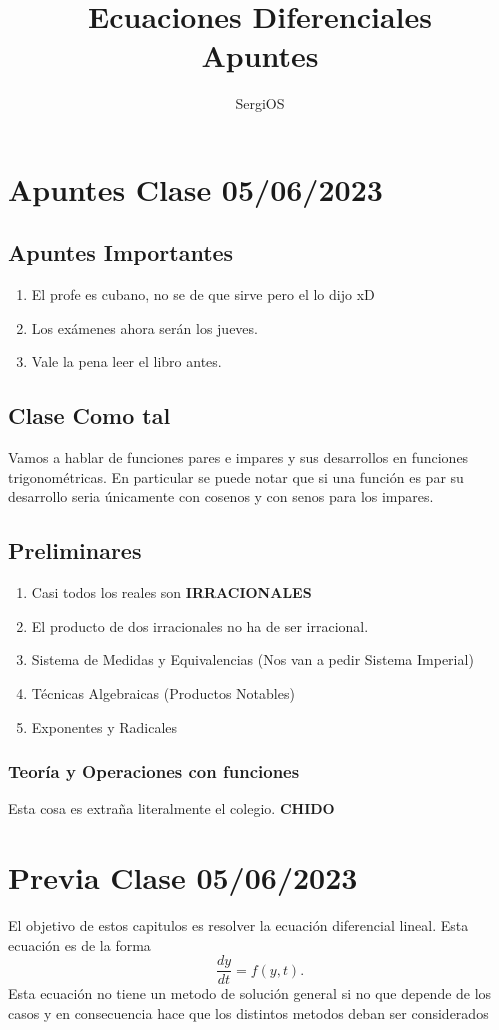 \documentclass{report}
\title{\Huge{Ecuaciones Diferenciales}\\Apuntes}
\author{\huge{SergiOS}}
\date{}
\begin{document}
\maketitle
\newpage%
\tableofcontents
\pagebreak

\chapter{Apuntes Clase 05/06/2023}
\section{Apuntes Importantes}
\begin{enumerate}
  \item El profe es cubano, no se de que sirve pero el lo dijo xD
  \item Los exámenes ahora serán los jueves.
  \item Vale la pena leer el libro antes.
\end{enumerate}
\section{Clase Como tal}
Vamos a hablar de funciones pares e impares y sus desarrollos en funciones trigonométricas. En particular se puede notar que si una función es par su desarrollo seria únicamente con cosenos y con senos para los impares.
\section{Preliminares}
\begin{enumerate}
  \item Casi todos los reales son \textbf{IRRACIONALES}
  \item El producto de dos irracionales no ha de ser irracional.
  \item Sistema de Medidas y Equivalencias (Nos van a pedir Sistema Imperial)
  \item Técnicas Algebraicas (Productos Notables)
  \item Exponentes y Radicales
\end{enumerate}
\subsection{Teoría y Operaciones con funciones}
Esta cosa es extraña literalmente el colegio. \textbf{CHIDO}
\chapter{Previa Clase 05/06/2023}
El objetivo de estos capitulos es resolver la ecuación diferencial lineal. Esta ecuación es de la forma 
\begin{equation}
  \label{eq:Primer_Orden}
  \frac{dy}{dt}=f(y,t)
.\end{equation}
Esta ecuación no tiene un metodo de solución general si no que depende de los casos y en consecuencia hace que los distintos metodos deban ser considerados
\end{document}
